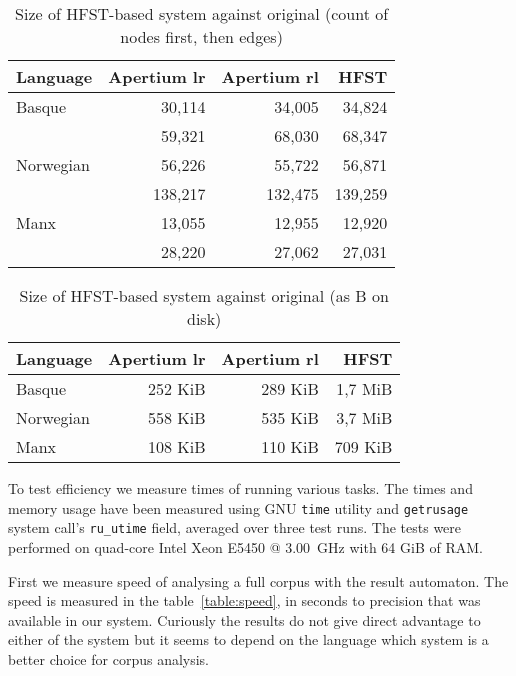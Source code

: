 \documentclass[10pt,a4paper]{article}
\begin{document}
\begin{table}[h]
\begin{center}
\begin{tabular}{|l|r|r|r|}
\hline
\bf Language & \bf Apertium lr & \bf Apertium rl & \bf HFST \\
\hline
Basque       & 30,114  & 34,005  & 34,824  \\
             & 59,321  & 68,030  & 68,347  \\
Norwegian    & 56,226  & 55,722  & 56,871  \\
             & 138,217 & 132,475 & 139,259 \\
Manx         & 13,055  & 12,955  & 12,920  \\
             & 28,220  & 27,062  & 27,031  \\
\hline
\end{tabular}
\caption{Size of HFST-based system against original (count of nodes first, then
edges)
\label{table:graph-size}}
\end{center}
\end{table}

\begin{table}[h]
\begin{center}
\begin{tabular}{|l|r|r|r|}
\hline
\bf Language & \bf Apertium lr & \bf Apertium rl & \bf HFST \\
\hline
Basque       & 252 KiB & 289 KiB & 1,7 MiB \\
Norwegian    & 558 KiB & 535 KiB & 3,7 MiB \\
Manx         & 108 KiB & 110 KiB & 709 KiB \\
\hline
\end{tabular}
\caption{Size of HFST-based system against original (as B on disk)
\label{table:size}}
\end{center}
\end{table}

To test efficiency we measure times of running various tasks.  The times and
memory usage have been measured using GNU \texttt{time} utility and
\texttt{getrusage} system call's \texttt{ru\_utime} field, averaged over three
test runs. The tests were performed on quad-core Intel Xeon E5450 @ 3.00~GHz
with 64 GiB of RAM. 

First we measure speed of analysing a full corpus with the result automaton.
The speed is measured in the table~\ref{table:speed}, in
seconds to precision that was available in our system. Curiously the results
do not give direct advantage to either of the system but it seems to
depend on the language which system is a better choice for corpus analysis.
\end{document}
